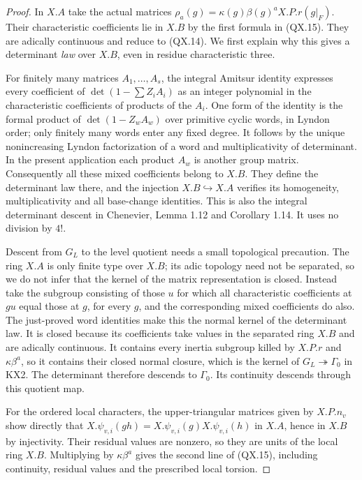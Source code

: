 \begin{proof}
In $X.A$ take the actual matrices
$\rho_a(g)=\kappa(g)\beta(g)^a X.P.r(g|_F)$.
Their characteristic coefficients lie in $X.B$ by the first
formula in (QX.15).  They are adically continuous and reduce
to (QX.14).  We first explain why this gives a determinant
\emph{law} over $X.B$, even in residue characteristic three.

For finitely many matrices $A_1,\ldots,A_s$, the integral
Amitsur identity expresses every coefficient of
$\det(1-\sum Z_iA_i)$ as an integer polynomial in the
characteristic coefficients of products of the $A_i$.
One form of the identity is the formal product of
$\det(1-Z_wA_w)$ over primitive cyclic words, in Lyndon
order; only finitely many words enter any fixed degree.
It follows by the unique nonincreasing Lyndon factorization
of a word and multiplicativity of determinant.  In the
present application each product $A_w$ is another group
matrix.  Consequently all these mixed coefficients belong
to $X.B$.  They define the determinant law there, and the
injection $X.B\hookrightarrow X.A$ verifies its homogeneity,
multiplicativity and all base-change identities.  This is
also the integral determinant descent in Chenevier,
Lemma 1.12 and Corollary 1.14.  It uses no division by $4!$.

Descent from $G_L$ to the level quotient needs a small
topological precaution.  The ring $X.A$ is only finite type
over $X.B$; its adic topology need not be separated, so we
do not infer that the kernel of the matrix representation
is closed.  Instead take the subgroup consisting of those
$u$ for which all characteristic coefficients at $gu$
equal those at $g$, for every $g$, and the corresponding
mixed coefficients do also.  The just-proved word identities
make this the normal kernel of the determinant law.
It is closed because its coefficients take values in the
separated ring $X.B$ and are adically continuous.  It
contains every inertia subgroup killed by $X.P.r$ and
$\kappa\beta^a$, so it contains their closed normal closure,
which is the kernel of $G_L\twoheadrightarrow\Gamma_0$
in KX2.  The determinant therefore descends to $\Gamma_0$.
Its continuity descends through this quotient map.

For the ordered local characters, the upper-triangular
matrices given by $X.P.n_v$ show directly that
$X.\psi_{v,i}(gh)=X.\psi_{v,i}(g)X.\psi_{v,i}(h)$ in $X.A$,
hence in $X.B$ by injectivity.  Their residual values are
nonzero, so they are units of the local ring $X.B$.
Multiplying by $\kappa\beta^a$ gives the second line of
(QX.15), including continuity, residual values and the
prescribed local torsion.


\end{proof}
